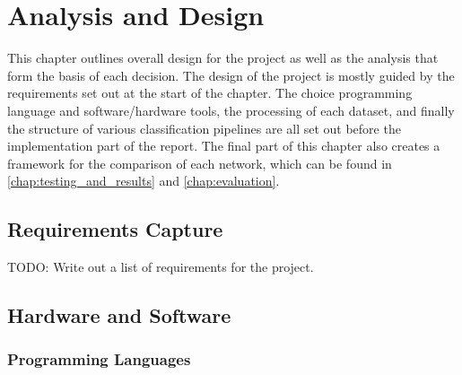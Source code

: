 \chapter{Analysis and Design} \label{chap:analysis_and_design}

This chapter outlines overall design for the project as well as the analysis that form the basis of each decision. The design of the project is mostly guided by the requirements set out at the start of the chapter. The choice programming language and software/hardware tools, the processing of each dataset, and finally the structure of various classification pipelines are all set out before the implementation part of the report. The final part of this chapter also creates a framework for the comparison of each network, which can be found in \cref{chap:testing_and_results} and \cref{chap:evaluation}.

\section{Requirements Capture}


\color{red} TODO: Write out a list of requirements for the project. \color{black}

\section{Hardware and Software}

\subsection{Programming Languages}

